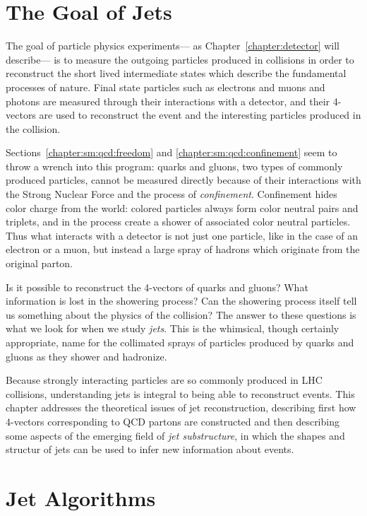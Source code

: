 \label{chapter:jets-and-substructure}
\section{The Goal of Jets}

The goal of particle physics experiments--- as Chapter~\ref{chapter:detector} will describe--- is to measure the outgoing particles produced in collisions in order to reconstruct the short lived intermediate states which describe the fundamental processes of nature. Final state particles such as electrons and muons and photons are measured through their interactions with a detector, and their 4-vectors are used to reconstruct the event and the interesting particles produced in the collision. 

Sections~\ref{chapter:sm:qcd:freedom} and \ref{chapter:sm:qcd:confinement} seem to throw a wrench into this program: quarks and gluons, two types of commonly produced particles, cannot be measured directly because of their interactions with the Strong Nuclear Force and the process of \textit{confinement}. Confinement hides color charge from the world: colored particles always form color neutral pairs and triplets, and in the process create a shower of associated color neutral particles. Thus what interacts with a detector is not just one particle, like in the case of an electron or a muon, but instead a large spray of hadrons which originate from the original parton.

Is it possible to reconstruct the 4-vectors of quarks and gluons? What information is lost in the showering process? Can the showering process itself tell us something about the physics of the collision? The answer to these questions is what we look for when we study \textit{jets}. This is the whimsical, though certainly appropriate, name for the collimated sprays of particles produced by quarks and gluons as they shower and hadronize. 

Because strongly interacting particles are so commonly produced in LHC collisions, understanding jets is integral to being able to reconstruct events. This chapter addresses the theoretical issues of jet reconstruction, describing first how 4-vectors corresponding to QCD partons are constructed and then describing some aspects of the emerging field of \textit{jet substructure}, in which the shapes and structur of jets can be used to infer new information about events.



\section{Jet Algorithms}

